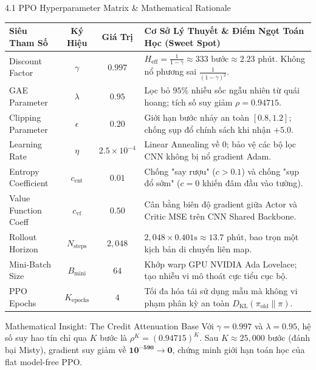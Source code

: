 \documentclass[aspectratio=169, 10pt]{beamer}
\begin{document}
\begin{frame}{4.1 PPO Hyperparameter Matrix \& Mathematical Rationale}
\begin{table}[ht]
\centering
\scriptsize
\begin{tabular}{lccl}
\toprule
\textbf{Siêu Tham Số} & \textbf{Ký Hiệu} & \textbf{Giá Trị} & \textbf{Cơ Sở Lý Thuyết \& Điểm Ngọt Toán Học (Sweet Spot)} \\
\midrule
Discount Factor & $\gamma$ & $0.997$ & $H_{\text{eff}} = \frac{1}{1-\gamma} \approx 333\text{ bước} \approx 2.23\text{ phút}$. Không nổ phương sai $\frac{1}{(1-\gamma)^2}$. \\
GAE Parameter & $\lambda$ & $0.95$ & Lọc bỏ $95\%$ nhiễu sốc ngẫu nhiên từ quái hoang; tích số suy giảm $\rho = 0.94715$. \\
Clipping Parameter & $\epsilon$ & $0.20$ & Giới hạn bước nhảy an toàn $[0.8, 1.2]$; chống sụp đổ chính sách khi nhận $+5.0$. \\
Learning Rate & $\eta$ & $2.5 \times 10^{-4}$ & Linear Annealing về $0$; bảo vệ các bộ lọc CNN không bị nổ gradient Adam. \\
Entropy Coefficient & $c_{\text{ent}}$ & $0.01$ & Chống "say rượu" ($c > 0.1$) và chống "sụp đổ sớm" ($c=0$ khiến đâm đầu vào tường). \\
Value Function Coeff & $c_{\text{vf}}$ & $0.50$ & Cân bằng biên độ gradient giữa Actor và Critic MSE trên CNN Shared Backbone. \\
Rollout Horizon & $N_{\text{steps}}$ & $2{,}048$ & $2{,}048 \times 0.401\text{s} \approx 13.7\text{ phút}$, bao trọn một kịch bản di chuyển liên map. \\
Mini-Batch Size & $B_{\text{mini}}$ & $64$ & Khớp warp GPU NVIDIA Ada Lovelace; tạo nhiễu vi mô thoát cực tiểu cục bộ. \\
PPO Epochs & $K_{\text{epochs}}$ & $4$ & Tối đa hóa tái sử dụng mẫu mà không vi phạm phân kỳ an toàn $D_{\text{KL}}(\pi_{\text{old}} \parallel \pi)$. \\
\bottomrule
\end{tabular}
\end{table}

\vspace{-0.2cm}
\begin{alertblock}{Mathematical Insight: The Credit Attenuation Base}
    \footnotesize Với $\gamma = 0.997$ và $\lambda = 0.95$, hệ số suy hao tín chỉ qua $K$ bước là $\rho^K = (0.94715)^K$. Sau $K \approx 25{,}000$ bước (đánh bại Misty), gradient suy giảm về $\mathbf{10^{-590}} \to \mathbf{0}$, chứng minh giới hạn toán học của flat model-free PPO.
\end{alertblock}
\end{frame}
\end{document}
